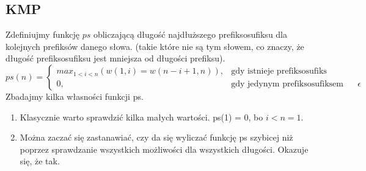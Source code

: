 \documentclass{article}
\theoremstyle{break}
\begin{document}
\subsection{KMP}
Zdefiniujmy funkcję $ps$ obliczającą długość najdłuższego prefiksosufiksu dla kolejnych prefiksów danego słowa. (takie które nie są tym słowem, co znaczy, że długość prefiksosufiksu jest mniejsza od długości prefiksu).
\begin{displaymath}
    ps(n) = \begin{cases}
       max_{1 < i < n}( w(1, i) = w(n-i+1, n)), & \text{gdy istnieje prefiksosufiks} \\
       0, & \text{gdy jedynym prefiksosufiksem jest $\epsilon$}
        \end{cases}
\end{displaymath}
Zbadajmy kilka własności funkcji ps.\\
\begin{enumerate}
\item  Klasycznie warto sprawdzić kilka małych wartości. ps(1) = 0, bo $ i< n = 1 $.
\item Można zaczać się zastanawiać, czy da się wyliczać funkcję ps szybicej niż poprzez sprawdzanie wszystkich możliwości dla wszystkich długości. Okazuje się, że tak.
\end{enumerate}
\end{document}
